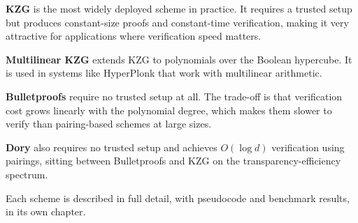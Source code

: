 \textbf{KZG} \cite{kate2010} is the most widely deployed scheme in
practice. It requires a trusted setup but produces constant-size
proofs and constant-time verification, making it very attractive for
applications where verification speed matters.
 
\textbf{Multilinear KZG} \cite{papamanthou2013} extends KZG to
polynomials over the Boolean hypercube. It is used in systems like
HyperPlonk \cite{hyperplonk2022} that work with multilinear
arithmetic.
 
\textbf{Bulletproofs} \cite{bulletproofs2018} require no trusted
setup at all. The trade-off is that verification cost grows linearly
with the polynomial degree, which makes them slower to verify than
pairing-based schemes at large sizes.
 
\textbf{Dory} \cite{dory2021} also requires no trusted setup and
achieves $O(\log d)$ verification using pairings, sitting between
Bulletproofs and KZG on the transparency-efficiency spectrum.
 
Each scheme is described in full detail, with pseudocode and
benchmark results, in its own chapter.